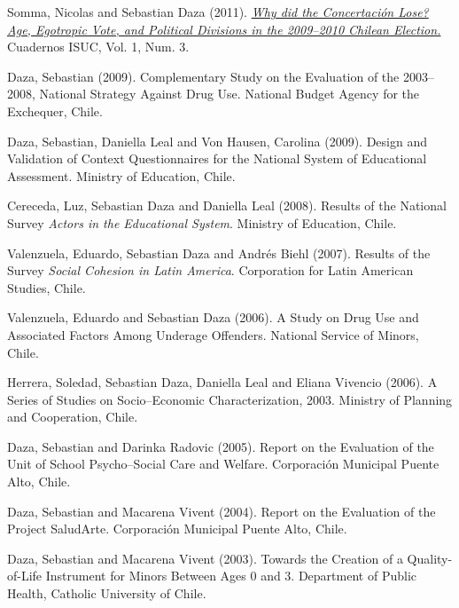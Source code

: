 \documentclass[10pt,letterpaper]{article}
\renewenvironment{itemize}{
  \begin{list}{}{
    \setlength{\leftmargin}{1.5em}
    \setlength{\itemsep}{0.25em}
    \setlength{\parskip}{0pt}
    \setlength{\parsep}{0.25em}
  }
}{
  \end{list}
}
\begin{document}
\begin{itemize}

\item Somma, Nicolas and Sebastian Daza (2011).
  \textit{
  \href{https://sdaza.com/assets/pdf/articulo-nicolas-somma.pdf}
  {Why did the Concertación Lose? Age, Egotropic Vote, and Political Divisions in the 2009--2010 Chilean Election.}
  }
  Cuadernos ISUC, Vol. 1, Num. 3.

\item Daza, Sebastian (2009). Complementary Study on the Evaluation of the 2003--2008, National Strategy Against Drug Use. National Budget Agency for the Exchequer, Chile.

\item Daza, Sebastian, Daniella Leal and Von Hausen, Carolina (2009). Design and Validation of Context Questionnaires for the National System of Educational Assessment. Ministry of Education, Chile.

\item Cereceda, Luz, Sebastian Daza and Daniella Leal (2008). Results of the National Survey \textit{Actors in the Educational System}. Ministry of Education, Chile.

\item Valenzuela, Eduardo, Sebastian Daza and Andrés Biehl (2007). Results of the Survey \textit{Social Cohesion in Latin America}. Corporation for Latin American Studies, Chile.

\item Valenzuela, Eduardo and Sebastian Daza (2006). A Study on Drug Use and Associated Factors Among Underage Offenders. National Service of Minors, Chile.

\item Herrera, Soledad, Sebastian Daza, Daniella Leal and Eliana Vivencio (2006). A Series of Studies on Socio--Economic Characterization, 2003. Ministry of Planning and Cooperation, Chile.

\item Daza, Sebastian and Darinka Radovic (2005). Report on the Evaluation of the Unit of School Psycho--Social Care and Welfare. Corporación Municipal Puente Alto, Chile.

\item Daza, Sebastian and  Macarena Vivent (2004). Report on the Evaluation of the Project SaludArte. Corporación Municipal Puente Alto, Chile.

\item Daza, Sebastian and Macarena Vivent (2003). Towards the Creation of a Quality-of-Life Instrument for Minors Between Ages 0 and 3. Department of Public Health, Catholic University of Chile.


\end{itemize}
\end{document}
